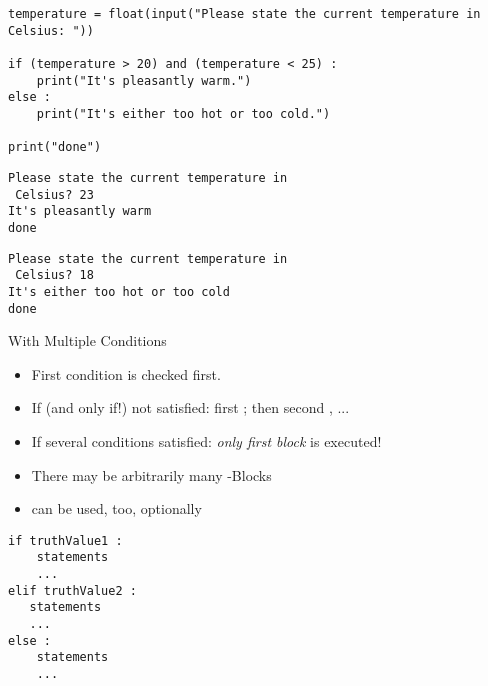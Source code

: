 
\begin{frame}[fragile]
%
\begin{codebox}[Example]
\begin{verbatim}
temperature = float(input("Please state the current temperature in Celsius: "))

if (temperature > 20) and (temperature < 25) :
    print("It's pleasantly warm.")
else :
    print("It's either too hot or too cold.")

print("done")
\end{verbatim}
\end{codebox}
%
\begin{minipage}[t]{.49\linewidth}
\begin{cmdbox}[Output 1]
\begin{verbatim}
Please state the current temperature in
 Celsius? 23
It's pleasantly warm
done
\end{verbatim}
\end{cmdbox}
\end{minipage}
%
\begin{minipage}[t]{.49\linewidth}
\begin{cmdbox}[Output 2]
\begin{verbatim}
Please state the current temperature in
 Celsius? 18
It's either too hot or too cold
done
\end{verbatim}
\end{cmdbox}
\end{minipage}
%
\end{frame}


\begin{frame}[fragile]{ With Multiple Conditions}
%
\begin{minipage}[t]{.49\linewidth}
\begin{itemize}
\item First condition is checked first.
\item If (and only if!) not satisfied: first ; then second , ...
\item If several conditions satisfied: \emph{only first block} is executed!
\item There may be arbitrarily many -Blocks
\item {} can be used, too, optionally
\end{itemize}
\end{minipage}
%
\begin{minipage}[t]{.49\linewidth}
\phantom{xx}
\begin{codebox}
\begin{verbatim}
if truthValue1 :
    statements
    ...
elif truthValue2 :
   statements
   ...
else :
    statements
    ...
\end{verbatim}
\end{codebox}
\end{minipage}
%
\end{frame}

